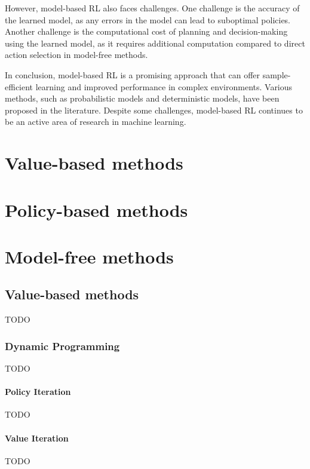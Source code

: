 \documentclass[../xlapes02]{subfiles}
\begin{document}
    However, model-based RL also faces challenges. One challenge is the accuracy of the learned model, as any errors in the model can lead to suboptimal policies. Another challenge is the computational cost of planning and decision-making using the learned model, as it requires additional computation compared to direct action selection in model-free methods.

    In conclusion, model-based RL is a promising approach that can offer sample-efficient learning and improved performance in complex environments. Various methods, such as probabilistic models and deterministic models, have been proposed in the literature. Despite some challenges, model-based RL continues to be an active area of research in machine learning.


    \section{Value-based methods}\label{sec:value-based-methods}


    \section{Policy-based methods}\label{sec:policy-based-methods}


    \section{Model-free methods}\label{sec:model-free-methods}

    \subsection{Value-based methods}\label{subsec:value-based-methods}
    TODO

    \subsubsection{Dynamic Programming}\label{subsubsec:dynamic-programming}
    TODO

    \paragraph{Policy Iteration}\label{par:policy-iteration}
    TODO

    \paragraph{Value Iteration}\label{par:value-iteration}
    TODO
\end{document}
